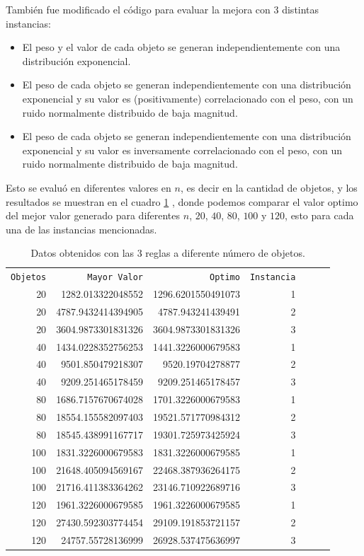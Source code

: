 \documentclass{article}
\begin{document}
Tambi\'en fue modificado el c\'odigo \citep{ana} para evaluar la mejora con $3$ distintas instancias:
\begin{itemize} \item El peso y el valor de cada objeto se generan independientemente con una distribuci\'on exponencial. \item El peso de cada objeto se generan independientemente con una distribuci\'on exponencial y su valor es (positivamente) correlacionado con el peso, con un ruido normalmente distribuido de baja magnitud. \item El peso de cada objeto se generan independientemente con una distribuci\'on exponencial y su valor es inversamente correlacionado con el peso, con un ruido normalmente distribuido de baja magnitud.
\end{itemize}

Esto se evalu\'o en diferentes valores en $n$, es decir en la cantidad de objetos, y los resultados se muestran en el cuadro \ref{t1} , donde podemos comparar el valor optimo del mejor valor generado para diferentes $n$, $20$, $40$, $80$, $100$ y $120$, esto para cada una de las instancias mencionadas.

\begin{table} [H]
 \caption{Datos obtenidos con las 3 reglas a diferente n\'umero de objetos.}
 \label{t1}
 \begin{center}
 \begin{tabular}{rrrrrrr}
\texttt{Objetos} & \texttt{Mayor Valor} & \texttt{Optimo} &\texttt{Instancia} \\
20  & 1282.013322048552   & 1296.6201550491073  & 1  \\ 
20  & 4787.9432414394905 & 4787.943241439491    & 2\\ 
20  & 3604.9873301831326 & 3604.9873301831326  & 3  \\ 
40  &1434.0228352756253  &1441.3226000679583  & 1   \\ 
40  & 9501.850479218307   &9520.19704278877 & 2 \\ 
40  & 9209.251465178459   &9209.251465178457  & 3   \\ 
80  & 1686.7157670674028 & 1701.3226000679583 & 1 \\ 
80  & 18554.155582097403 & 19521.571770984312 & 2  \\ 
80  &18545.438991167717  &19301.725973425924  & 3  \\ 
100 & 1831.3226000679583&1831.3226000679585  & 1  \\ 
100 & 21648.405094569167&22468.387936264175  & 2   \\ 
100 & 21716.411383364262& 23146.710922689716  & 3 \\ 
120 & 1961.3226000679585& 1961.3226000679585  & 1  \\ 
120 &27430.592303774454 &29109.191853721157  & 2  \\ 
120 &24757.55728136999   &26928.537475636997 & 3  \\ 

\end{tabular}
\end{center}
\end{table}
\end{document}
